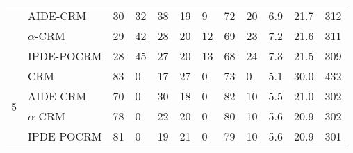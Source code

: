 \begin{tabular*}{\textwidth}{@{\extracolsep\fill}clllllllllll@{\extracolsep\fill}}
 & AIDE-CRM & 30 & 32 & 38 & 19 & 9 & 72 & 20 & 6.9 & 21.7 & 312\\
 & $\alpha$-CRM & 29 & 42 & 28 & 20 & 12 & 69 & 23 & 7.2 & 21.6 & 311\\
 & IPDE-POCRM & 28 & 45 & 27 & 20 & 13 & 68 & 24 & 7.3 & 21.5 & 309\\
\midrule
\multirow{4}{2em}{5} & CRM & 83 & 0 & 17 & 27 & 0 & 73 & 0 & 5.1 & 30.0 & 432\\
 & AIDE-CRM & 70 & 0 & 30 & 18 & 0 & 82 & 10 & 5.5 & 21.0 & 302\\
 & $\alpha$-CRM & 78 & 0 & 22 & 20 & 0 & 80 & 10 & 5.6 & 20.9 & 302\\
 & IPDE-POCRM & 81 & 0 & 19 & 21 & 0 & 79 & 10 & 5.6 & 20.9 & 301\\
\bottomrule
\end{tabular*}
